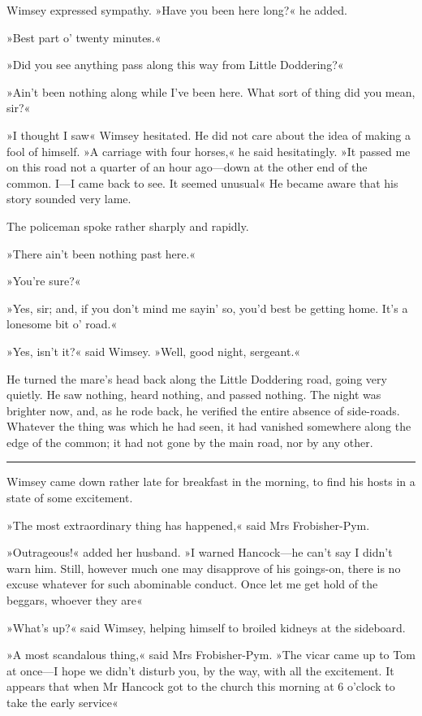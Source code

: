 Wimsey expressed sympathy. »Have you been here long?« he added.

»Best part o' twenty minutes.«

»Did you see anything pass along this way from Little Doddering?«

»Ain't been nothing along while I've been here. What sort of thing did you mean, sir?«

»I thought I saw\longdash« Wimsey hesitated. He did not care about the idea of making a fool of himself. »A carriage with four horses,« he said hesitatingly. »It passed me on this road not a quarter of an hour ago—down at the other end of the common. I—I came back to see. It seemed unusual\longdash« He became aware that his story sounded very lame.

The policeman spoke rather sharply and rapidly.

»There ain't been nothing past here.«

»You're sure?«

»Yes, sir; and, if you don't mind me sayin' so, you'd best be getting home. It's a lonesome bit o' road.«

»Yes, isn't it?« said Wimsey. »Well, good night, sergeant.«

He turned the mare's head back along the Little Doddering road, going very quietly. He saw nothing, heard nothing, and passed nothing. The night was brighter now, and, as he rode back, he verified the entire absence of side-roads. Whatever the thing was which he had seen, it had vanished somewhere along the edge of the common; it had not gone by the main road, nor by any other.

\noindent\hfil\rule{0.5\textwidth}{.4pt}\hfil 

Wimsey came down rather late for breakfast in the morning, to find his hosts in a state of some excitement.

»The most extraordinary thing has happened,« said Mrs Frobisher-Pym.

»Outrageous!« added her husband. »I warned Hancock—he can't say I didn't warn him. Still, however much one may disapprove of his goings-on, there is no excuse whatever for such abominable conduct. Once let me get hold of the beggars, whoever they are\longdash«

»What's up?« said Wimsey, helping himself to broiled kidneys at the sideboard.

»A most scandalous thing,« said Mrs Frobisher-Pym. »The vicar came up to Tom at once—I hope we didn't disturb you, by the way, with all the excitement. It appears that when Mr Hancock got to the church this morning at 6 o'clock to take the early service\longdash«

